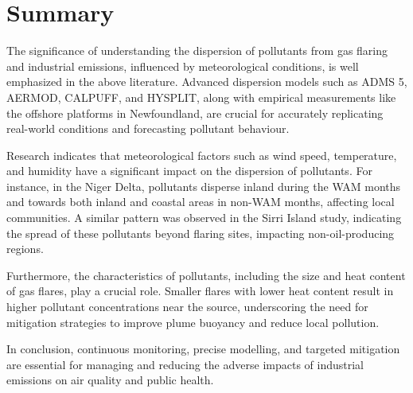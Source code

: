 \section*{Summary}
The significance of understanding the dispersion of pollutants from gas flaring and industrial emissions, influenced by meteorological conditions, is well emphasized in the above literature. Advanced dispersion models such as ADMS 5, AERMOD, CALPUFF, and HYSPLIT, along with empirical measurements like the offshore platforms in Newfoundland, are crucial for accurately replicating real-world conditions and forecasting pollutant behaviour.

Research indicates that meteorological factors such as wind speed, temperature, and humidity have a significant impact on the dispersion of pollutants. For instance, in the Niger Delta, pollutants disperse inland during the WAM months and towards both inland and coastal areas in non-WAM months, affecting local communities. A similar pattern was observed in the Sirri Island study, indicating the spread of these pollutants beyond flaring sites, impacting non-oil-producing regions.

Furthermore, the characteristics of pollutants, including the size and heat content of gas flares, play a crucial role. Smaller flares with lower heat content result in higher pollutant concentrations near the source, underscoring the need for mitigation strategies to improve plume buoyancy and reduce local pollution.

In conclusion, continuous monitoring, precise modelling, and targeted mitigation are essential for managing and reducing the adverse impacts of industrial emissions on air quality and public health.